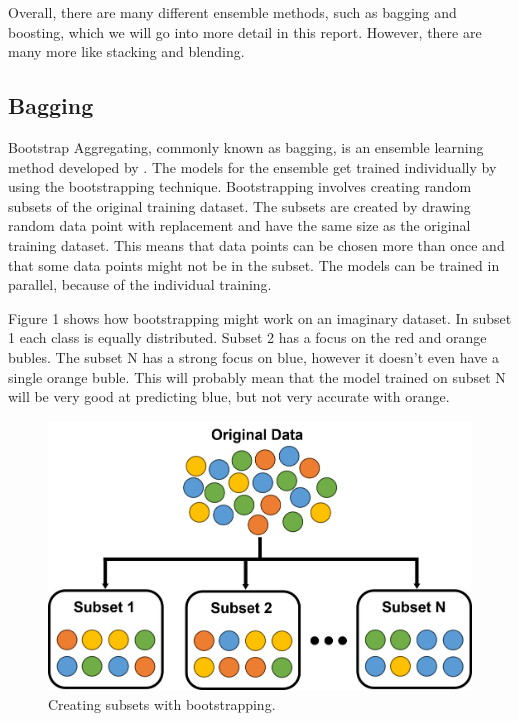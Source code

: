 Overall, there are many different ensemble methods, such as bagging and boosting, 
which we will go into more detail in this report. However, there are many more 
like stacking and blending.


\subsection{Bagging}

Bootstrap Aggregating, commonly known as bagging, is an ensemble learning method
developed by \citet*{Breiman1996}. The models for the ensemble get trained individually
by using the bootstrapping technique. Bootstrapping involves creating random
subsets of the original training dataset. The subsets are created by drawing 
random data point with replacement and have the same size as the original
training dataset. This means that data points can be chosen more than once and
that some data points might not be in the subset. The models can be trained in
parallel, because of the individual training.


Figure 1 shows how bootstrapping might work on an imaginary dataset. In subset 1
each class is equally distributed. Subset 2 has a focus on the red and orange bubles.
The subset N has a strong focus on blue, however it doesn't even have a single 
orange buble. This will probably mean that the model trained on subset N will be very
good at predicting blue, but not very accurate with orange.

\begin{figure}[htbp]
    \centering
    \includegraphics[width=.5\textwidth]{figures/bootstrapping}
    \caption{Creating subsets with bootstrapping.}
\end{figure}


